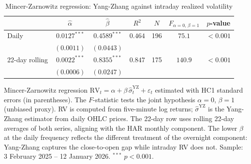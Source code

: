 \begin{table}[htbp]
\centering
\small
\caption{Mincer-Zarnowitz regression: Yang-Zhang against intraday realized volatility}
\label{tab:proxy-validation}
\begin{tabular}{lcccccc}
\toprule
 & $\hat{\alpha}$ & $\hat{\beta}$ & $R^2$ & $N$ & $F_{\alpha=0,\,\beta=1}$ & $p$-value \\
\midrule
Daily         & $0.0127^{***}$ & $0.4589^{***}$ & $0.464$ & 196 & $75.1$ & $<0.001$ \\
              & $(0.0011)$ & $(0.0443)$ &  &  &  & \\[4pt]
22-day rolling & $0.0022^{***}$ & $0.8355^{***}$ & $0.847$ & 175 & $140.9$ & $<0.001$ \\
              & $(0.0006)$ & $(0.0247)$ &  &  &  & \\
\bottomrule
\end{tabular}
\par\smallskip
{\footnotesize Mincer-Zarnowitz regression $\text{RV}_t = \alpha + \beta\,\hat{\sigma}^{\text{YZ}}_t + \varepsilon_t$
estimated with HC1 standard errors (in parentheses). The $F$-statistic tests the joint
hypothesis $\alpha = 0$, $\beta = 1$ (unbiased proxy). RV is computed from five-minute
log returns; $\hat{\sigma}^{\text{YZ}}$ is the Yang-Zhang estimator from daily OHLC prices.
The 22-day row uses rolling 22-day averages of both series, aligning with the HAR monthly
component. The lower $\hat{\beta}$ at the daily frequency reflects the different treatment of
the overnight component: Yang-Zhang captures the close-to-open gap while intraday RV does not.
Sample: 3 February 2025 -- 12 January 2026.
$^{***}$ $p < 0.001$.}
\end{table}
